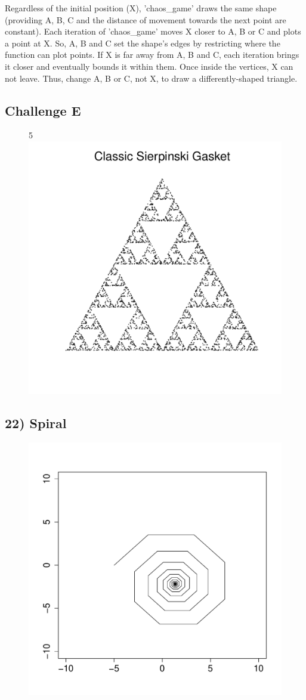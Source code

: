 \documentclass[11pt]{article}
\begin{document}
Regardless of the initial position (X), 'chaos\_game' draws the same shape (providing A, B, C and the distance of movement towards the next point are constant). Each iteration of 'chaos\_game' moves X closer to A, B or C and plots a point at X. So, A, B and C set the shape's edges by restricting where the function can plot points. If X is far away from A, B and C, each iteration brings it closer and eventually bounds it within them. Once inside the vertices, X can not leave. Thus, change A, B or C, not X, to draw a differently-shaped triangle.

\subsection*{Challenge E}
\begin{figure}[h]
5\includegraphics[width=0.5\linewidth]{../Results/19_Classic_Sierpinski_Gasket}
\end{figure}

\newpage

\subsection*{22) Spiral}
\begin{figure}[h]
\includegraphics[width=0.5\linewidth]{../Results/22_spiral.pdf}
\end{figure}
\end{document}
